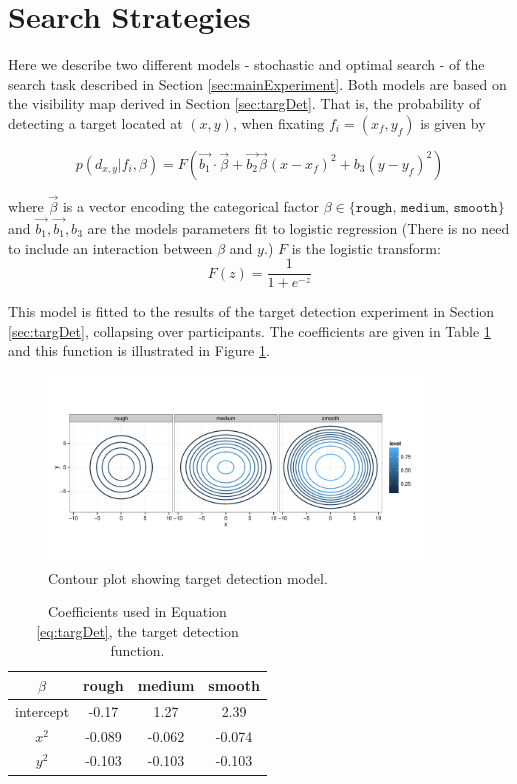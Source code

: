 \documentclass[preprint, authoryear]{elsarticle} %
\begin{document}
\section{Search Strategies}
\label{sec:strats}

Here we describe two different models - stochastic and optimal search - of the search task described in Section \ref{sec:mainExperiment}. Both models are based on the visibility map derived in Section \ref{sec:targDet}. That is, the probability of detecting a target located at $(x,y)$, when fixating $f_i = (x_f,y_f)$ is given by

\begin{equation}
 p(d_{x,y}|f_i,\beta) = F(\vec{b_1}\cdot\vec{\beta} + \vec{b_2}\vec{\beta} (x-x_f)^2 + b_3(y-y_f)^2)
 \label{eq:targDet}
\end{equation} 

where $\vec{\beta}$ is a vector encoding the categorical factor $\beta \in \{\texttt{rough, medium, smooth}\}$ and $\vec{b_1},\vec{b_1},b_3 $ are the models parameters fit to logistic regression (There is no need to include an interaction between $\beta$ and $y$.) $F$ is the logistic transform:
\begin{equation}
F(z)= \frac{1}{1+e^{-z}}
\end{equation}

This model is fitted to the results of the target detection experiment in Section \ref{sec:targDet}, collapsing over participants. The coefficients are given in Table \ref{tab:targdetcoef} and this function is illustrated in Figure \ref{fig:targDet}.

\begin{figure}
	\centering
	\includegraphics[width=10cm]{fig/targDet/aggtargdet2.pdf}
	\caption{Contour plot showing target detection model.} 
	\label{fig:targDet}
\end{figure}

\begin{table}
\centering
\begin{tabular}{c|ccc}
 $\beta$ 	& rough & medium & smooth \\
\hline
intercept	& -0.17 & 1.27 & 2.39\\
$x^2$	& -0.089 & -0.062 & -0.074 \\
$y^2$	& -0.103 & -0.103 & -0.103 \\
\end{tabular}
\caption{Coefficients used in Equation \ref{eq:targDet}, the target detection function.}
\label{tab:targdetcoef}
\end{table}
\end{document}
